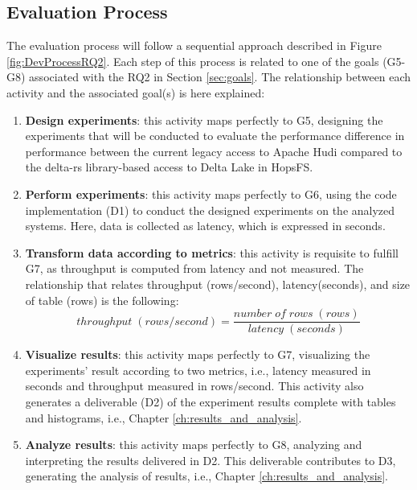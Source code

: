 \subsection{Evaluation Process}
\label{subsec:eval_process}
The evaluation process will follow a sequential approach described in Figure \ref{fig:DevProcessRQ2}. Each step of this process is related to one of the goals (G5-G8) associated with the RQ2 in Section \ref{sec:goals}.
The relationship between each activity and the associated goal(s) is here explained:
\begin{enumerate}
    \item \textbf{Design experiments}: this activity maps perfectly to G5, designing the experiments that will be conducted to evaluate the performance difference in performance between the current legacy access to Apache Hudi compared to the delta-rs library-based access to Delta Lake in \gls{HopsFS}. 
    \item \textbf{Perform experiments}: this activity maps perfectly to G6, using the code implementation (D1) to conduct the designed experiments on the analyzed systems. Here, data is collected as latency, which is expressed in seconds.
    \item \textbf{Transform data according to metrics}: this activity is requisite to fulfill G7, as throughput is computed from latency and not measured. The relationship that relates throughput (rows/second), latency(seconds), and size of table (rows) is the following:
    \[ throughput \; (rows/second) = \frac{number \; of \; rows \; (rows)}{latency \;(seconds)}\]
    \item \textbf{Visualize results}: this activity maps perfectly to G7, visualizing the experiments' result according to two metrics, i.e., latency measured in seconds and throughput measured in rows/second. This activity also generates a deliverable (D2) of the experiment results complete with tables and histograms, i.e., Chapter \ref{ch:results_and_analysis}.
    \item \textbf{Analyze results}: this activity maps perfectly to G8, analyzing and interpreting the results delivered in D2. This deliverable contributes to D3, generating the analysis of results, i.e., Chapter \ref{ch:results_and_analysis}.
\end{enumerate}
